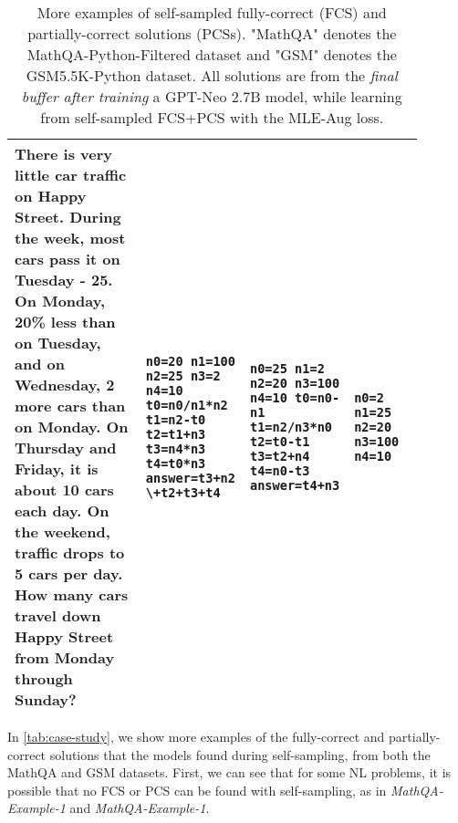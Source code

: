 \begin{table}[t]
\begin{tabular}{p{0.35\linewidth}p{0.18\linewidth}p{0.18\linewidth}p{0.18\linewidth}}
There is very little car traffic on Happy Street. During the week, most cars pass it on Tuesday - 25. On Monday, 20\% less than on Tuesday, and on Wednesday, 2 more cars than on Monday. On Thursday and Friday, it is about 10 cars each day. On the weekend, traffic drops to 5 cars per day. How many cars travel down Happy Street from Monday through Sunday? &
\texttt{n0=20\newline
n1=100\newline
n2=25\newline
n3=2\newline
n4=10\newline
t0=n0/n1*n2\newline
t1=n2-t0\newline
t2=t1+n3\newline
t3=n4*n3\newline
t4=t0*n3\newline
answer=t3+n2 \textbackslash \newline\quad+t2+t3+t4} &
\texttt{n0=25\newline
n1=2\newline
n2=20\newline
n3=100\newline
n4=10\newline
t0=n0-n1\newline
t1=n2/n3*n0\newline
t2=t0-t1\newline
t3=t2+n4\newline
t4=n0-t3\newline
answer=t4+n3} &
\texttt{n0=2\newline
n1=25\newline
n2=20\newline
n3=100\newline
n4=10}
\\\bottomrule
\end{tabular}
\vspace{2pt}
\caption{More examples of self-sampled fully-correct (FCS) and partially-correct solutions (PCSs). "MathQA" denotes the MathQA-Python-Filtered dataset and "GSM" denotes the GSM5.5K-Python dataset. All solutions are from the \textit{final buffer after training} a GPT-Neo 2.7B model, while learning from self-sampled FCS+PCS with the MLE-Aug loss.}
\label{tab:case-study}
\end{table} In \autoref{tab:case-study}, we show more examples of the fully-correct and partially-correct solutions that the models found during self-sampling, from both the MathQA and GSM datasets. First, we can see that for some NL problems, it is possible that no FCS or PCS can be found with self-sampling, as in \textit{MathQA-Example-1} and \textit{MathQA-Example-1}. 
